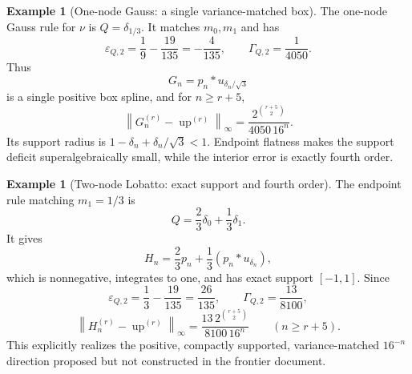 \documentclass[11pt]{article}
\theoremstyle{definition}
\newtheorem{example}[theorem]{Example}
\theoremstyle{remark}
\newcommand{\Up}{\operatorname{up}}
\newcommand{\norm}[1]{\left\lVert #1\right\rVert}
\begin{document}
\begin{example}[One-node Gauss: a single variance-matched box]
\label{ex:gauss-one}
The one-node Gauss rule for $\nu$ is $Q=\delta_{1/3}$.  It matches $m_0,m_1$ and
has
\[
 \varepsilon_{Q,2}=\frac19-\frac{19}{135}=-\frac4{135},
 \qquad \Gamma_{Q,2}=\frac1{4050}.
\]
Thus
\begin{equation}
 G_n=p_n*u_{\delta_n/\sqrt3}
 \label{eq:Gn}
\end{equation}
is a single positive box spline, and for $n\ge r+5$,
\begin{equation}
 \boxed{
 \norm{G_n^{(r)}-\Up^{(r)}}_\infty
 =\frac{2^{\binom{r+5}{2}}}{4050\,16^n}.}
 \label{eq:Gauss-one-law}
\end{equation}
Its support radius is $1-\delta_n+\delta_n/\sqrt3<1$.  Endpoint flatness makes the
support deficit superalgebraically small, while the interior error is exactly fourth
order.
\end{example}

\begin{example}[Two-node Lobatto: exact support and fourth order]
\label{ex:lobatto-two}
The endpoint rule matching $m_1=1/3$ is
\begin{equation}
 Q=\frac23\delta_0+\frac13\delta_1.
 \label{eq:lobatto-Q}
\end{equation}
It gives
\begin{equation}
 H_n=\frac23p_n+\frac13(p_n*u_{\delta_n}),
 \label{eq:Hn}
\end{equation}
which is nonnegative, integrates to one, and has exact support $[-1,1]$.  Since
\[
 \varepsilon_{Q,2}=\frac13-\frac{19}{135}=\frac{26}{135},
 \qquad \Gamma_{Q,2}=\frac{13}{8100},
\]
\begin{equation}
 \boxed{
 \norm{H_n^{(r)}-\Up^{(r)}}_\infty
 =\frac{13\,2^{\binom{r+5}{2}}}{8100\,16^n}}
 \qquad(n\ge r+5).
 \label{eq:Lobatto-two-law}
\end{equation}
This explicitly realizes the positive, compactly supported, variance-matched
$16^{-n}$ direction proposed but not constructed in the frontier document.
\end{example}
\end{document}
